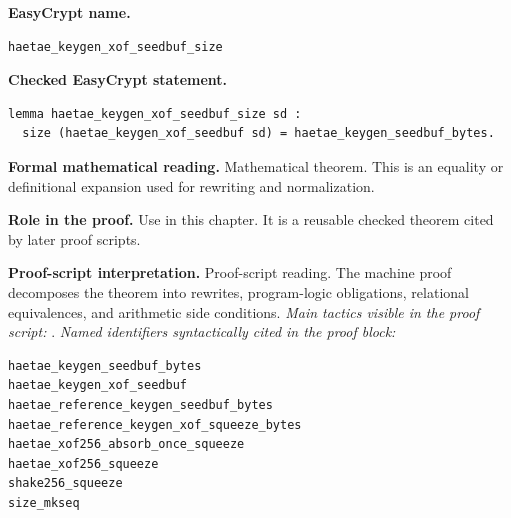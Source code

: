 \begin{formaltheorem}
\noindent\textbf{EasyCrypt name.}
\begin{lstlisting}[language=EasyCrypt,basicstyle=\ttfamily\scriptsize]
haetae_keygen_xof_seedbuf_size
\end{lstlisting}
\noindent\textbf{Checked EasyCrypt statement.}
\begin{lstlisting}[language=EasyCrypt,basicstyle=\ttfamily\scriptsize]
lemma haetae_keygen_xof_seedbuf_size sd :
  size (haetae_keygen_xof_seedbuf sd) = haetae_keygen_seedbuf_bytes.
\end{lstlisting}
\noindent\textbf{Formal mathematical reading.}
Mathematical theorem. This is an equality or definitional expansion used for rewriting and normalization.

\noindent\textbf{Role in the proof.}
Use in this chapter. It is a reusable checked theorem cited by later proof scripts.

\noindent\textbf{Proof-script interpretation.}
Proof-script reading. The machine proof decomposes the theorem into rewrites, program-logic obligations, relational equivalences, and arithmetic side conditions.
\emph{Main tactics visible in the proof script:} .
\emph{Named identifiers syntactically cited in the proof block:}
\begin{lstlisting}[language=EasyCrypt,basicstyle=\ttfamily\scriptsize]
haetae_keygen_seedbuf_bytes
haetae_keygen_xof_seedbuf
haetae_reference_keygen_seedbuf_bytes
haetae_reference_keygen_xof_squeeze_bytes
haetae_xof256_absorb_once_squeeze
haetae_xof256_squeeze
shake256_squeeze
size_mkseq
\end{lstlisting}

\end{formaltheorem}


